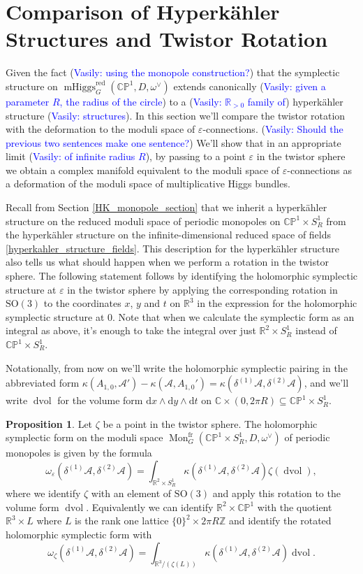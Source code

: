 \documentclass[11pt, oneside, reqno]{amsart}
\theoremstyle{definition} \newtheorem{definition}{Definition}[section]
\newtheorem{prop}[definition]{Proposition}
\theoremstyle{definition} \newtheorem{remark}[definition]{Remark}
\theoremstyle{definition} \newtheorem{remarks}[definition]{Remarks}
\theoremstyle{definition} \newtheorem{question}[definition]{Question}
\theoremstyle{definition} \newtheorem*{note}{Note}
\theoremstyle{definition} \newtheorem{example}[definition]{Example}
\theoremstyle{definition} \newtheorem{examples}[definition]{Examples}
\newcommand{\bb}[1]{\mathbb{#1}}
\newcommand{\mc}[1]{\mathcal{#1}}
\newcommand{\CC}{\mathbb{C}}
\newcommand{\RR}{\mathbb{R}}
\newcommand{\ZZ}{\mathbb{Z}}
\newcommand{\eps}{\varepsilon}
\newcommand{\SO}{\mathrm{SO}}
\newcommand{\sub}{\subseteq}
\DeclareMathOperator{\dvol}{dvol}
\DeclareMathOperator{\mhiggs}{mHiggs}
\DeclareMathOperator{\mon}{Mon}
\renewcommand{\d}{\mathrm{d}}
\newcommand{\fr}{\mathrm{fr}}
\newcommand{\vasily}[1]{(\textcolor{blue}{Vasily: #1})}
\begin{document}
\section{Comparison of Hyperk\"ahler Structures and Twistor Rotation} \label{hyperkahler_section}
Given the fact \vasily{using the monopole construction?} that the symplectic structure on $\mhiggs_G^{\text{red}}(\bb{CP}^1,D,\omega^\vee)$ extends canonically \vasily{given a parameter $R$, the radius of the circle} to a \vasily{$\mathbb{R}_{>0}$ family of} hyperk\"ahler structure \vasily{structures}.  In this section we'll compare the twistor rotation with the deformation to the moduli space of $\eps$-connections. \vasily{Should the previous two sentences make one sentence?}  
We'll show that in an appropriate limit \vasily{of infinite radius $R$}, by passing to a point $\eps$ in the twistor sphere we obtain a complex manifold equivalent to the moduli space of $\eps$-connections as a deformation of the moduli space of multiplicative Higgs bundles.

Recall from Section \ref{HK_monopole_section} that we inherit a hyperk\"ahler structure on the reduced moduli space of periodic monopoles on $\bb{CP}^1 \times S^1_R$ from the hyperk\"ahler structure on the infinite-dimensional reduced space of fields \ref{hyperkahler_structure_fields}.  This description for the hyperk\"ahler structure also tells us what should happen when we perform a rotation in the twistor sphere.  The following statement follows by identifying the holomorphic symplectic structure at $\eps$ in the twistor sphere by applying the corresponding rotation in $\SO(3)$ to the coordinates $x$, $y$ and $t$ on $\RR^3$ in the expression for the holomorphic symplectic structure at $0$.  Note that when we calculate the symplectic form as an integral as above, it's enough to take the integral over just $\RR^2 \times S^1_R$ instead of $\bb{CP}^1 \times S^1_R$.

Notationally, from now on we'll write the holomorphic symplectic pairing in the abbreviated form $\kappa(A_{1,0}, \mc A') - \kappa(\mc A, A_{1,0}') = \kappa(\delta^{(1)} \mc A, \delta^{(2)} \mc A)$, and we'll write $\dvol$ for the volume form $\d x \wedge \d y \wedge \d t$ on $\CC \times (0,2\pi R)\sub \bb{CP}^1 \times S^1_R$.

\begin{prop}
Let $\zeta$ be a point in the twistor sphere.  The holomorphic symplectic form on the moduli space $\mon_G^{\fr}(\bb{CP}^1 \times S^1_R, D, \omega^\vee)$ of periodic monopoles is given by the formula 
\[\omega_\eps(\delta^{(1)}\mc A, \delta^{(2)}\mc A) = \int_{\RR^2 \times S^1_R} \kappa(\delta^{(1)} \mc A, \delta^{(2)} \mc A) \zeta(\dvol),\]
where we identify $\zeta$ with an element of $\SO(3)$ and apply this rotation to the volume form $\dvol$.  Equivalently we can identify $\RR^2 \times \bb{CP}^1$ with the quotient $\RR^3 \times L$ where $L$ is the rank one lattice $\{0\}^2 \times 2\pi R\ZZ$ and identify the rotated holomorphic symplectic form with 
\[\omega_\zeta(\delta^{(1)}\mc A, \delta^{(2)}\mc A) = \int_{\RR^3/(\zeta(L))} \kappa(\delta^{(1)} \mc A, \delta^{(2)} \mc A) \dvol.\]
\end{prop}
\end{document}
